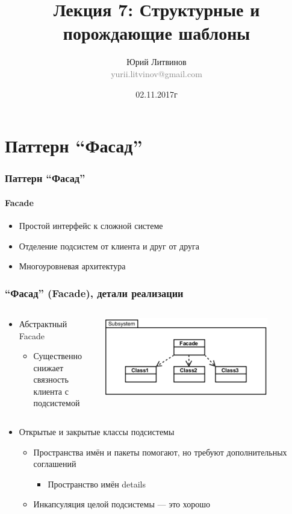 \documentclass[xetex,mathserif,serif]{beamer}
\title[Шаблоны]{Лекция 7: Структурные и порождающие шаблоны}
\author[Юрий Литвинов]{Юрий Литвинов\\\small{\textcolor{gray}{yurii.litvinov@gmail.com}}}
\date{02.11.2017г}
\begin{document}
	\frame{\titlepage}

	\section{Паттерн ``Фасад''}

	\begin{frame}
		\frametitle{Паттерн ``Фасад''}
		\framesubtitle{Facade}
		\begin{itemize}
			\item Простой интерфейс к сложной системе
			\item Отделение подсистем от клиента и друг от друга
			\item Многоуровневая архитектура
		\end{itemize}
	\end{frame}

	\begin{frame}
		\frametitle{``Фасад'' (Facade), детали реализации}
		\begin{columns}
			\begin{column}{0.5\textwidth}
				\begin{itemize}
					\item Абстрактный Facade
					\begin{itemize}
						\item Существенно снижает связность клиента с подсистемой
					\end{itemize}
				\end{itemize}
			\end{column}
			\begin{column}{0.5\textwidth}
				\begin{center}
					\includegraphics[width=0.8\textwidth]{facade.png}
				\end{center}
			\end{column}
		\end{columns}
		\begin{itemize}
			\item Открытые и закрытые классы подсистемы
			\begin{itemize}
				\item Пространства имён и пакеты помогают, но требуют дополнительных соглашений
				\begin{itemize}
					\item Пространство имён details
				\end{itemize}
				\item Инкапсуляция целой подсистемы --- это хорошо
			\end{itemize}
		\end{itemize}
	\end{frame}
\end{document}
